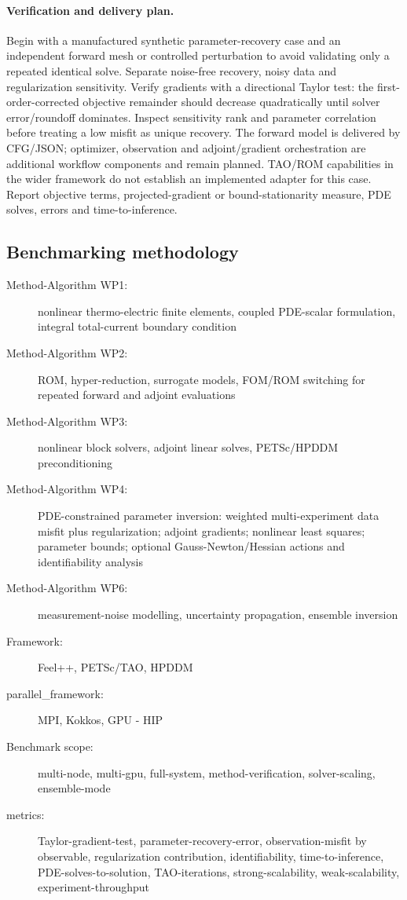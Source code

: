 \paragraph{Verification and delivery plan.}
Begin with a manufactured synthetic parameter-recovery case and an independent
forward mesh or controlled perturbation to avoid validating only a repeated
identical solve. Separate noise-free recovery, noisy data and regularization
sensitivity. Verify gradients with a directional Taylor test: the
first-order-corrected objective remainder should decrease quadratically until
solver error/roundoff dominates. Inspect sensitivity rank and parameter
correlation before treating a low misfit as unique recovery.
The forward model is delivered by CFG/JSON; optimizer, observation and
adjoint/gradient orchestration are additional workflow components and remain
planned. TAO/ROM capabilities in the wider framework do not establish an
implemented adapter for this case. Report objective terms, projected-gradient
or bound-stationarity measure, PDE solves, errors and time-to-inference.

\subsection{Benchmarking methodology}


\begin{description}
  \item[Method-Algorithm WP1:] nonlinear thermo-electric finite elements, coupled PDE-scalar formulation, integral total-current boundary condition
  \item[Method-Algorithm WP2:] ROM, hyper-reduction, surrogate models, FOM/ROM switching for repeated forward and adjoint evaluations
  \item[Method-Algorithm WP3:] nonlinear block solvers, adjoint linear solves, PETSc/HPDDM preconditioning
  \item[Method-Algorithm WP4:] PDE-constrained parameter inversion: weighted multi-experiment data misfit plus regularization; adjoint gradients; nonlinear least squares; parameter bounds; optional Gauss-Newton/Hessian actions and identifiability analysis
  \item[Method-Algorithm WP6:] measurement-noise modelling, uncertainty propagation, ensemble inversion
  \item[Framework:] Feel++, PETSc/TAO, HPDDM
  \item[parallel\_framework:] MPI, Kokkos, GPU - HIP
  \item[Benchmark scope:] multi-node, multi-gpu, full-system, method-verification, solver-scaling, ensemble-mode
  \item[metrics:] Taylor-gradient-test, parameter-recovery-error, observation-misfit by observable, regularization contribution, identifiability, time-to-inference, PDE-solves-to-solution, TAO-iterations, strong-scalability, weak-scalability, experiment-throughput
\end{description}
